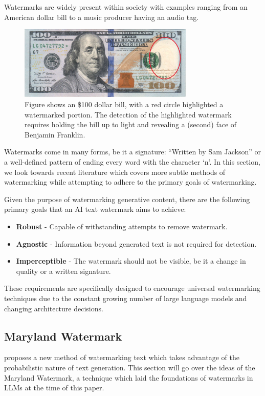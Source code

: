 \documentclass{l4proj}
\theoremstyle{definition}
\begin{document}
    Watermarks are widely present within society with examples ranging from an American dollar bill to a music producer having an audio tag. 

    \begin{figure}[h]
        \centering
        \includegraphics[height=3.5cm, width=1\linewidth, keepaspectratio]{images/background/dbill-highlighted.png}
        \caption{Figure shows an \$100 dollar bill, with a red circle highlighted a watermarked portion. The detection of the highlighted watermark requires holding the bill up to light and revealing a (second) face of Benjamin Franklin.}
         \label{fig:dbill-watermark} 
    \end{figure}

    Watermarks come in many forms, be it a signature: ``Written by Sam Jackson'' or a well-defined pattern of ending every word with the character `n'. In this section, we look towards recent literature which covers more subtle methods of watermarking while attempting to adhere to the primary goals of watermarking.
         
    Given the purpose of watermarking generative content, there are the following primary goals that an AI text watermark aims to achieve:
    \begin{itemize}
        \setlength\itemsep{0.5em}
        \item \textbf{Robust} - Capable of withstanding attempts to remove watermark.
        \item \textbf{Agnostic} - Information beyond generated text is not required for detection.
        \item \textbf{Imperceptible} - The watermark should not be visible, be it a change in quality or a written signature.
    \end{itemize}

    These requirements are specifically designed to encourage universal watermarking techniques due to the constant growing number of large language models and changing architecture decisions.
    
    \subsection{Maryland Watermark}
        \label{sec:maryland-watermark}
        \citet{kirchenbauer2023watermark} proposes a new method of watermarking text which takes advantage of the probabilistic nature of text generation. This section will go over the ideas of the Maryland Watermark, a technique which laid the foundations of watermarks in LLMs at the time of this paper.
\end{document}
